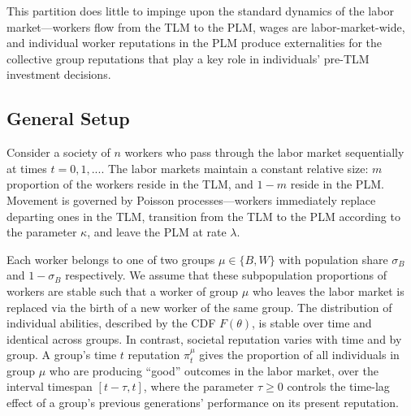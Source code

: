 \documentclass[sigconf]{acmart}
\theoremstyle{definition}
\begin{document}
This partition does little to impinge upon the standard dynamics  of the labor market---workers flow from the TLM to the PLM, wages are labor-market-wide, and individual worker reputations in the PLM produce externalities for the collective group reputations that play a key role in individuals' pre-TLM investment decisions. 
\subsection{General Setup}
Consider a society of $n$ workers who pass through the labor market sequentially at times $t = 0, 1, ...$. The labor markets maintain a constant relative size: $m$ proportion of the workers reside in the TLM, and $1-m$ reside in the PLM. Movement is governed by Poisson processes---workers immediately replace departing ones in the TLM, transition from the TLM to the PLM according to the parameter $\kappa$, and leave the PLM at rate $\lambda$. 

Each worker belongs to one of two groups $\mu \in \{B, W\}$ with population share $\sigma_B$ and $1-\sigma_B$ respectively. We assume that these subpopulation proportions of workers are stable such that a worker of group $\mu$ who leaves the labor market is replaced via the birth of a new worker of the same group. %
The distribution of individual abilities, described by the CDF $F(\theta)$, is stable over time and identical across groups. In contrast, societal reputation varies with time and by group. A group's time $t$ reputation $\pi^\mu_{t}$ gives the proportion of all individuals in group $\mu$ who are producing ``good'' outcomes in the labor market, over the interval timespan $[t-\tau,t]$, where the parameter $\tau \ge 0$ controls the time-lag effect of a group's previous generations' performance on its present reputation. %
\end{document}
